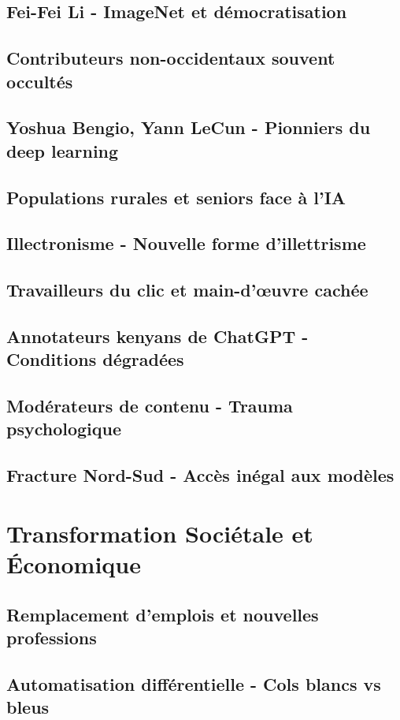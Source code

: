 \documentclass[12pt,a4paper]{book}
\begin{document}
\section{Fei-Fei Li - ImageNet et démocratisation}
\section{Contributeurs non-occidentaux souvent occultés}
\section{Yoshua Bengio, Yann LeCun - Pionniers du deep learning}
\section{Populations rurales et seniors face à l'IA}
\section{Illectronisme - Nouvelle forme d'illettrisme}
\section{Travailleurs du clic et main-d'œuvre cachée}
\section{Annotateurs kenyans de ChatGPT - Conditions dégradées}
\section{Modérateurs de contenu - Trauma psychologique}
\section{Fracture Nord-Sud - Accès inégal aux modèles}

\chapter{Transformation Sociétale et Économique}
\section{Remplacement d'emplois et nouvelles professions}
\section{Automatisation différentielle - Cols blancs vs bleus}
\end{document}
